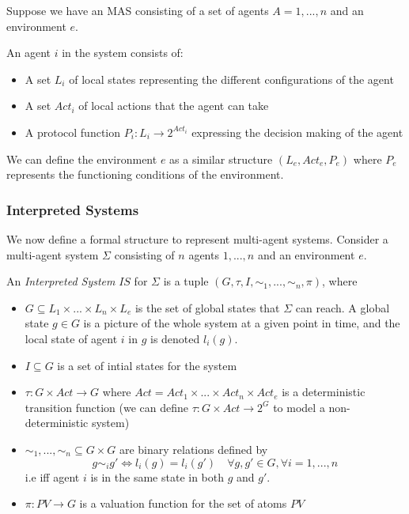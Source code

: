 \documentclass{article}
\newenvironment{definition}[1][Definition]{\begin{trivlist}
\item[\hskip \labelsep {\bfseries #1}]}{\end{trivlist}}
\begin{document}
Suppose we have an MAS consisting of a set of agents $A = {1, ..., n}$ and an environment $e$.
\begin{definition} 
An agent $i$ in the system consists of: 
\begin{itemize}
\item A set $L_i$ of local states representing the different configurations of the agent
\item A set $Act_i$ of local actions that the agent can take
\item A protocol function $P_i : L_i \rightarrow 2^{Act_i} $ expressing the decision making of the agent
\end{itemize} 
\end{definition}

We can define the environment $e$ as a similar structure $(L_e, Act_e, P_e)$ where $P_e$ represents the functioning conditions of the environment. 

\subsubsection{Interpreted Systems}

We now define a formal structure to represent multi-agent systems. Consider a multi-agent system $\Sigma$ consisting of $n$ agents $1, ..., n$ and an environment $e$.
\begin{definition}
An \textit{Interpreted System} $IS$ for $\Sigma$ is a tuple $(G, \tau, I, \sim_1, ..., \sim_n, \pi)$, where
\begin{itemize}
\item $G \subseteq L_1 \times ... \times L_n \times L_e$ is the set of global states that $\Sigma$ can reach. A global state $g \in G$ is a picture of the whole system at a given point in time, and the local state of agent $i$ in $g$ is denoted $l_i(g)$.
\item $I \subseteq G$ is a set of intial states for the system
\item $\tau : G \times Act \rightarrow G $ where $Act = Act_1 \times ... \times Act_n \times Act_e$ is a deterministic transition function (we can define $\tau : G \times Act \rightarrow 2^G$ to model a non-deterministic system)
\item $\sim_1, ..., \sim_n \subseteq G \times G$  are binary relations defined by $$g \sim_i g' \Leftrightarrow l_i(g) = l_i(g') \quad \forall g, g' \in G, \forall i = 1, ..., n$$
i.e iff agent $i$ is in the same state in both $g$ and $g'$. 
\item $\pi : PV \rightarrow G$ is a valuation function for the set of atoms $PV$
\end{itemize}
\end{definition}
\end{document}
